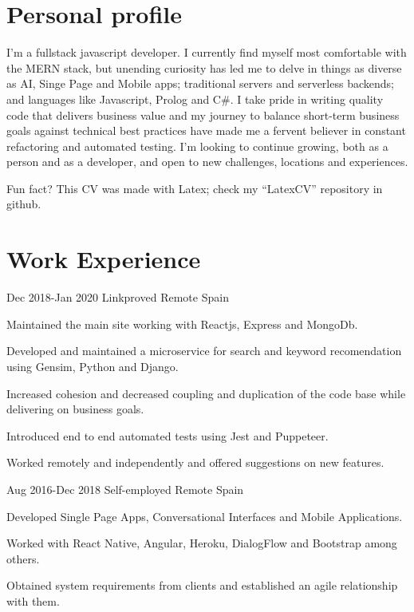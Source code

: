 \documentclass[10pt]{CurriculumVitae}
\begin{document}
  \makeheading


  \section{Personal profile}
    {
      I'm a fullstack javascript developer.
      I currently find myself most comfortable with the MERN stack,
      but unending curiosity has led me to delve in things as diverse as
      AI, Singe Page and Mobile apps;
      traditional servers and serverless backends;
      and languages like Javascript, Prolog and C\#.
      I take pride in writing quality code that delivers business value
      and my journey to balance short-term business goals against technical best practices
      have made me a fervent believer in constant refactoring and automated testing.
      I'm looking to continue growing, both as a person and as a developer,
      and open to new challenges, locations and experiences.
      
      \null\hfill {\scriptsize Fun fact? This CV was made with Latex; check my ``LatexCV'' repository in github.}
    }


  \section{Work Experience}
      {Dec 2018-Jan 2020}
      {Linkproved}
      {Remote}
      {Spain}
      {
        \item Maintained the main site working with Reactjs, Express and MongoDb.
        \item Developed and maintained a microservice for search and keyword recomendation using Gensim, Python and Django.
        \item Increased cohesion and decreased coupling and duplication of the code base while delivering on business goals.
        \item Introduced end to end automated tests using Jest and Puppeteer.
        \item Worked remotely and independently and offered suggestions on new features.
      }

      {Aug 2016-Dec 2018}
      {Self-employed}
      {Remote}
      {Spain}
      {
        \item Developed Single Page Apps, Conversational Interfaces and Mobile Applications.
        \item Worked with React Native, Angular, Heroku, DialogFlow and Bootstrap among others.
        \item Obtained system requirements from clients and established an agile relationship with them.
      }
   
\end{document}
